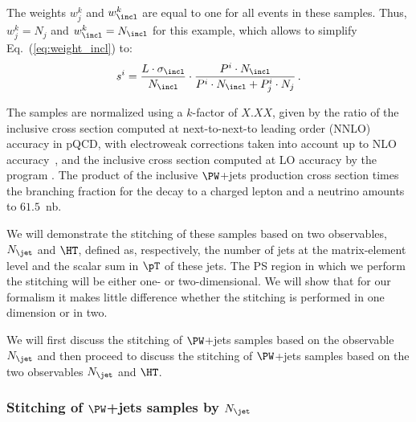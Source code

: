 The weights $w_{j}^{k}$ and $w_{\incl}^{k}$ are equal to one for all events in these samples.
Thus, $w_{j}^{k} = N_{j}$ and $w_{\incl}^{k} = N_{\incl}$ for this example,
which allows to simplify Eq.~(\ref{eq:weight_incl}) to:
\begin{equation}
s^{i} = \frac{L \cdot \sigma_{\incl}}{N_{\incl}} \cdot \frac{P^{i} \cdot N_{\incl}}{P^{i} \cdot N_{\incl} + P_{j}^{i} \cdot N_{j}} \, .
\label{eq:weight_incl_simplified}
\end{equation}

The samples are normalized using a $k$-factor of $X.XX$, given by the ratio of the inclusive cross section computed at next-to-next-to leading order (NNLO) accuracy in pQCD,
with electroweak corrections taken into account up to NLO accuracy~\cite{Li:2012wna},
and the inclusive cross section computed at LO accuracy by the program \MGvATNLO.
The product of the inclusive $\PW$+jets production cross section times the branching fraction for the decay to a charged lepton and a neutrino amounts to $61.5$~nb.

We will demonstrate the stitching of these samples based on two observables,
$N_{\jet}$ and $\HT$, defined as, respectively, the number of jets at the matrix-element level and the scalar sum in $\pT$ of these jets.
The PS region in which we perform the stitching will be either one- or two-dimensional.
We will show that for our formalism
it makes little difference whether the stitching is performed in one dimension or in two.

We will first discuss the stitching of $\PW$+jets samples based on the observable $N_{\jet}$
and then proceed to discuss the stitching of $\PW$+jets samples based on the two observables $N_{\jet}$ and $\HT$.


\subsubsection{Stitching of \texorpdfstring{$\PW$}{W}+jets samples by \texorpdfstring{$N_{\jet}$}{Njet}}
\label{sec:WJets_vs_Njet}

